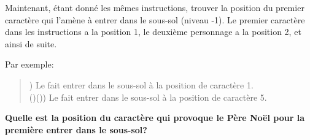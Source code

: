 \documentclass[12pt]{article}
\newenvironment{example}{\begin{quote}%
}{%
\end{quote}%
}
\begin{document}
    Maintenant, étant donné les mêmes instructions, trouver la position du premier caractère qui l'amène à entrer dans le sous-sol (niveau -1). Le premier caractère dans les instructions a la position 1, le deuxième personnage a la position 2, et ainsi de suite.

    Par exemple:
    
    \begin{example}
      )     Le fait entrer dans le sous-sol à la position de caractère 1.\\
      ()())   Le fait entrer dans le sous-sol à la position de caractère 5.
    \end{example}
    
    \textbf{Quelle est la position du caractère qui provoque le Père Noël pour la première entrer dans le sous-sol?}  
    
\end{document}
